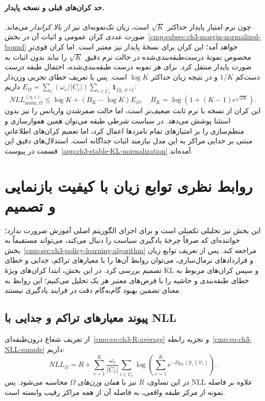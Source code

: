 \paragraph{حد کران‌های قبلی و نسخه پایدار.}
چون نرم امتیاز پایدار حداکثر $\sqrt K$
است، زیان تک‌نمونه‌ای نیز
\emph{از بالا کراندار} می‌ماند.
صورت عددی کران عمومی و اثبات آن
در بخش~\ref{cmp:subsec:ch3-margin-normalized-bound}
خواهد آمد؛ این کران برای
نسخهٔ پایدار نیز معتبر است.
اما کران قوی‌ترِ مخصوص نمونهٔ
درست‌طبقه‌بندی‌شده در حالت
نرم دقیق $\sqrt K$ را
نباید بدون اثبات به صورت پایدار منتقل کرد.
برای هر نمونه درست طبقه‌بندی‌شده،
احتمال طبقه درست دست‌کم $1/K$
و در نتیجه زیان حداکثر $\log K$ است.
پس با تعریف خطای تجربی وزن‌دار
$E_\Omega=\sum_c(\omega_c/|C_c|)
\sum_{i\in C_c}\mathbf1_{\{\widehat y_i\ne c\}}$
داریم:
\begin{equation}\label{cmp:eq:ch3-stable-normalized-error-bound}
\boxed{
NLL_{\mathrm{norm},\Omega}^{(\eta,\varepsilon)}
\le\log K+(B_K-\log K)E_\Omega,
\quad B_K=\log(1+(K-1)e^{\sqrt{2K}}).
}
\end{equation}
این کران از نسخه با نرم ثابت ضعیف‌تر است،
اما حالت صفرشدن واریانس را نیز
بدون استثنا پوشش می‌دهد.
در سیاست شرطی طبقه می‌توان همین
هموارسازی و منظم‌سازی را بر
امتیازهای تمام نامزدها اعمال کرد،
اما تعمیم کران‌های اطلاعاتیِ مبتنی بر
جدایی مراکز به این مدل نیازمند اثبات جداگانه است.
استدلال‌های دقیق این قسمت
در پیوست~\ref{app:ch3-stable-KL-normalization}
آمده‌اند.


\section{روابط نظری توابع زیان با کیفیت بازنمایی و تصمیم}
\label{cmp:sec:ch3-loss-quality-theory}
این بخش نیز تحلیلی تکمیلی است و برای اجرای
الگوریتم اصلی آموزش ضرورت ندارد؛
خواننده‌ای که صرفاً چرخهٔ یادگیری سیاست
را دنبال می‌کند، می‌تواند مستقیماً به
بخش~\ref{cmp:sec:ch3-policy-learning-algorithm}
مراجعه کند.
پس از تعریف توابع زیان و قراردادهای نرمال‌سازی،
می‌توان روابط آن‌ها را با معیارهای تراکم،
جدایی و خطای تصمیم بررسی کرد.
در این بخش، ابتدا کران‌های ویژهٔ KL و سپس
کران‌های مربوط به خطای طبقه‌بندی و حاشیه را
با فرض‌های معتبر هر یک تحلیل می‌کنیم؛
این روابط به معنای تضمین بهبود گام‌به‌گام
دقت در فرایند یادگیری نیستند.

\subsection{پیوند معیارهای تراکم و جدایی با NLL}
\label{cmp:subsec:ch3-density-separation-NLL-bound}
از تعریف شعاع درون‌طبقه‌ای~\eqref{cmp:eq:ch3-R-average} و تجزیه رابطه~\eqref{cmp:eq:ch3-NLL-sample} داریم:
\begin{equation}\label{cmp:eq:ch3-NLL-R}
NLL_\Omega=R+
\sum_{c=1}^{K}\frac{\omega_c}{|C_c|}\sum_{i\in C_c}
\log\left(\sum_{r=1}^{K}
e^{-D_{\mathrm{KL}}(\mathscr Y_i\|\mathcal V_r)}\right).
\end{equation}
در این تساوی، $R$ نیز با \emph{همان وزن‌های} $\Omega$ محاسبه می‌شود. پس NLL علاوه بر فاصله نمونه از مرکز طبقه واقعی، به فاصله آن از همه مراکز رقیب وابسته است.

